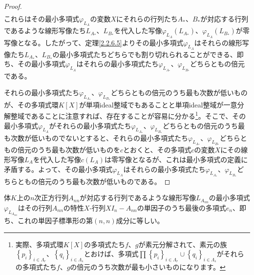 \documentclass[dvipdfmx]{jsarticle}
\begin{document}
\begin{proof}
\begin{align*}
\end{align*}
これらはその最小多項式$\varphi_{L_{A}}$の変数$X$にそれらの行列たち$A_{*}$、$B_{*}$が対応する行列であるような線形写像たち$L_{A_{*}}$、$L_{B_{*}}$を代入した写像$\varphi_{L_{A}}\left( L_{A_{*}} \right)$、$\varphi_{L_{A}}\left( L_{B_{*}} \right)$が零写像となる。したがって、定理\ref{2.2.6.5}よりその最小多項式$\varphi_{L_{A}}$はそれらの線形写像たち$L_{A_{*}}$、$L_{B_{*}}$の最小多項式たちどちらでも割り切れられることができる、即ち、その最小多項式$\varphi_{L_{A}}$はそれらの最小多項式たち$\varphi_{L_{A_{*}}}$、$\varphi_{L_{B_{*}}}$どちらともの倍元である。\par
それらの最小多項式たち$\varphi_{L_{A_{*}}}$、$\varphi_{L_{B_{*}}}$どちらともの倍元のうち最も次数が低いものが、その多項式環$K[ X]$が単項ideal整域でもあることと単項ideal整域が一意分解整域であることに注意すれば、存在することが容易に分かる\footnote{実際、多項式環$K[ X]$の多項式たち$f$、$g$が素元分解されて、素元の族$\left\{ p_{i} \right\}_{i \in \varLambda_{r}}$、$\left\{ q_{i} \right\}_{i \in \varLambda_{s}}$とおけば、多項式$\prod_{} {\left\{ p_{i} \right\}_{i \in \varLambda_{r}} \cup \left\{ q_{i} \right\}_{i \in \varLambda_{s}}}$がそれらの多項式たち$f$、$g$の倍元のうち次数が最も小さいものになります。}。そこで、その最小多項式$\varphi_{L_{A}}$がそれらの最小多項式たち$\varphi_{L_{A_{*}}}$、$\varphi_{L_{B_{*}}}$どちらともの倍元のうち最も次数が低いものでないとすると、それらの最小多項式たち$\varphi_{L_{A_{*}}}$、$\varphi_{L_{B_{*}}}$どちらともの倍元のうち最も次数が低いものを$c$とおくと、その多項式$c$の変数$X$にその線形写像$L_{A}$を代入した写像$c\left( L_{A} \right)$は零写像となるが、これは最小多項式の定義に矛盾する。よって、その最小多項式$\varphi_{L_{A}}$はそれらの最小多項式たち$\varphi_{L_{A_{*}}}$、$\varphi_{L_{B_{*}}}$どちらともの倍元のうち最も次数が低いものである。
\end{proof}
\begin{thm}\label{2.2.8.19}
体$K$上の$n$次正方行列$A_{nn}$が対応する行列であるような線形写像$L_{A_{nn}}$の最小多項式$\varphi_{L_{A_{nn}}}$はその行列$A_{nn}$の特性$X$-行列$XI_{n} - A_{nn}$の単因子のうち最後の多項式$e_{n}$、即ち、これの単因子標準形の第$(n,n)$成分に等しい。
\end{thm}
\end{document}
